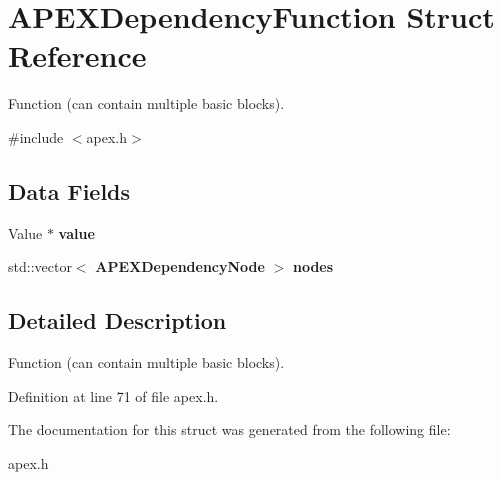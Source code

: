 \section{A\+P\+E\+X\+Dependency\+Function Struct Reference}
\label{structAPEXDependencyFunction}


Function (can contain multiple basic blocks).  




{\ttfamily \#include $<$apex.\+h$>$}

\subsection*{Data Fields}
\begin{DoxyCompactItemize}
\item 
\mbox{\label{structAPEXDependencyFunction_ad40a9b218b3412fbef6d251c096348da}} 
Value $\ast$ {\bfseries value}
\item 
\mbox{\label{structAPEXDependencyFunction_a88b9c8546d91814c01326726b91b882a}} 
std\+::vector$<$ \textbf{ A\+P\+E\+X\+Dependency\+Node} $>$ {\bfseries nodes}
\end{DoxyCompactItemize}


\subsection{Detailed Description}
Function (can contain multiple basic blocks). 

Definition at line 71 of file apex.\+h.



The documentation for this struct was generated from the following file\+:\begin{DoxyCompactItemize}
\item 
apex.\+h\end{DoxyCompactItemize}
